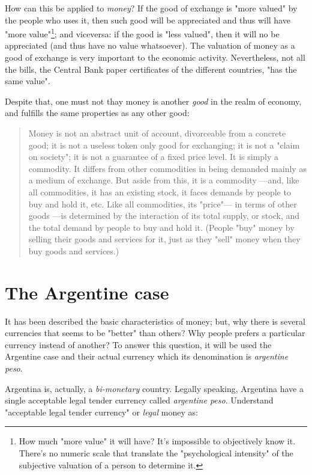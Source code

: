 \documentclass[12pt,a4paper,twoside]{book}
\begin{document}
How can this be applied to \textit{money}? If the good of exchange is "more valued" by the people who uses it, then such good will be appreciated and thus will have "more value"\footnote{How much "more value" it will have? It's impossible to objectively know it. There's no numeric scale that translate the "psychological intensity" of the subjective valuation of a person to determine it.}; and viceversa: if the good is "less valued", then it will no be appreciated (and thus have no value whatsoever). The valuation of money as a good of exchange is very important to the economic activity. Nevertheless, not all the bills, the Central Bank paper certificates of the different countries, "has the same value".

Despite that, one must not thay money is another \textit{good} in the realm of economy, and fulfills the same properties as any other good:

\begin{quotation}
Money is not an abstract unit of account, divorceable from a concrete good; it is not a useless token only good for exchanging; it is not a "claim on society"; it is not a guarantee of a fixed price level. It is simply a commodity. It differs from other commodities in being demanded mainly as a medium of exchange. But aside from this, it is a commodity —and, like all commodities, it has an existing stock, it faces demands by people to buy and hold it, etc. Like all commodities, its "price"— in terms of other goods —is determined by the interaction of its total supply, or stock, and the total demand by people to buy and hold it. (People "buy" money by selling their goods and services for it, just as they "sell" money when they buy goods and services.) \cite[pág. 9-10]{rothbard:money}
\end{quotation}

\chapter{The Argentine case}
It has been described the basic characteristics of money; but, why there is several currencies that seems to be "better" than others? Why people prefers a particular currency instead of another? To answer this question, it will be used the Argentine case and their actual currency which its denomination is \textit{argentine peso}.

Argentina is, actually, a \textit{bi-monetary} country. Legally speaking, Argentina have a single acceptable legal tender currency called \textit{argentine peso}. Understand "acceptable legal tender currency" or \textit{legal} money as:
\end{document}
